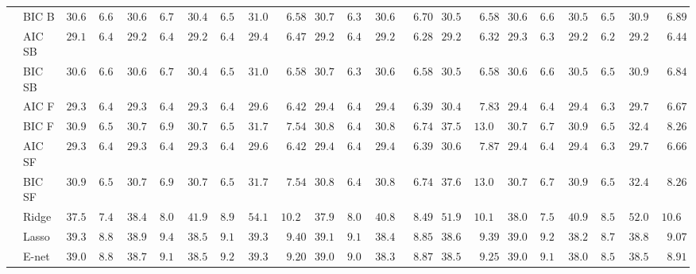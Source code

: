 \begin{tabular}{p{0.2cm}p{1cm}|p{0.6cm}p{0.6cm}|p{0.6cm}p{0.6cm}p{0.6cm}p{0.6cm}p{0.6cm}p{0.6cm}|p{0.6cm}p{0.6cm}p{0.6cm}p{0.6cm}p{0.6cm}p{0.6cm}|p{0.6cm}p{0.6cm}p{0.6cm}p{0.6cm}p{0.6cm}p{0.6cm}}
 & BIC B  & $30.68$ & $6.62$ & $30.64$ & $6.76$ & $30.47$ & $6.53$ & $31.01$ & $\phantom{0}6.58$ & $30.70$ & $6.35$ & $30.64$ & $\phantom{0}6.70$ & $30.59$ & $\phantom{0}6.58$ & $30.67$ & $6.63$ & $30.51$ & $6.54$ & $30.97$ & $\phantom{0}6.89$ \\
 & AIC SB  & $29.19$ & $6.40$ & $29.25$ & $6.43$ & $29.29$ & $6.48$ & $29.40$ & $\phantom{0}6.47$ & $29.25$ & $6.45$ & $29.29$ & $\phantom{0}6.28$ & $29.29$ & $\phantom{0}6.32$ & $29.33$ & $6.35$ & $29.21$ & $6.27$ & $29.23$ & $\phantom{0}6.44$ \\
 & BIC SB  & $30.68$ & $6.62$ & $30.62$ & $6.79$ & $30.47$ & $6.53$ & $31.01$ & $\phantom{0}6.58$ & $30.70$ & $6.35$ & $30.60$ & $\phantom{0}6.58$ & $30.59$ & $\phantom{0}6.58$ & $30.67$ & $6.63$ & $30.51$ & $6.54$ & $30.93$ & $\phantom{0}6.84$ \\
 & AIC F  & $29.31$ & $6.41$ & $29.36$ & $6.43$ & $29.38$ & $6.45$ & $29.65$ & $\phantom{0}6.42$ & $29.48$ & $6.45$ & $29.40$ & $\phantom{0}6.39$ & $30.49$ & $\phantom{0}7.83$ & $29.47$ & $6.41$ & $29.43$ & $6.31$ & $29.77$ & $\phantom{0}6.67$ \\
 & BIC F  & $30.94$ & $6.56$ & $30.76$ & $6.90$ & $30.74$ & $6.53$ & $31.79$ & $\phantom{0}7.54$ & $30.87$ & $6.45$ & $30.87$ & $\phantom{0}6.74$ & $37.59$ & $13.09$ & $30.74$ & $6.72$ & $30.92$ & $6.56$ & $32.43$ & $\phantom{0}8.26$ \\
 & AIC SF  & $29.31$ & $6.41$ & $29.36$ & $6.43$ & $29.38$ & $6.45$ & $29.65$ & $\phantom{0}6.42$ & $29.48$ & $6.44$ & $29.41$ & $\phantom{0}6.39$ & $30.60$ & $\phantom{0}7.87$ & $29.47$ & $6.41$ & $29.44$ & $6.31$ & $29.77$ & $\phantom{0}6.66$ \\
 & BIC SF  & $30.94$ & $6.56$ & $30.76$ & $6.90$ & $30.76$ & $6.55$ & $31.79$ & $\phantom{0}7.54$ & $30.87$ & $6.45$ & $30.87$ & $\phantom{0}6.74$ & $37.60$ & $13.09$ & $30.74$ & $6.72$ & $30.93$ & $6.55$ & $32.43$ & $\phantom{0}8.26$ \\
 & Ridge  & $37.50$ & $7.43$ & $38.48$ & $8.08$ & $41.94$ & $8.98$ & $54.12$ & $10.20$ & $37.97$ & $8.08$ & $40.86$ & $\phantom{0}8.49$ & $51.97$ & $10.11$ & $38.05$ & $7.59$ & $40.95$ & $8.59$ & $52.09$ & $10.63$ \\
 & Lasso  & $39.32$ & $8.88$ & $38.90$ & $9.42$ & $38.57$ & $9.18$ & $39.32$ & $\phantom{0}9.40$ & $39.19$ & $9.11$ & $38.42$ & $\phantom{0}8.85$ & $38.62$ & $\phantom{0}9.39$ & $39.08$ & $9.20$ & $38.20$ & $8.71$ & $38.81$ & $\phantom{0}9.07$ \\
 & E-net  & $39.02$ & $8.89$ & $38.73$ & $9.18$ & $38.50$ & $9.24$ & $39.37$ & $\phantom{0}9.20$ & $39.05$ & $9.07$ & $38.32$ & $\phantom{0}8.87$ & $38.54$ & $\phantom{0}9.25$ & $39.04$ & $9.19$ & $38.01$ & $8.52$ & $38.59$ & $\phantom{0}8.91$ \\

\end{tabular}
